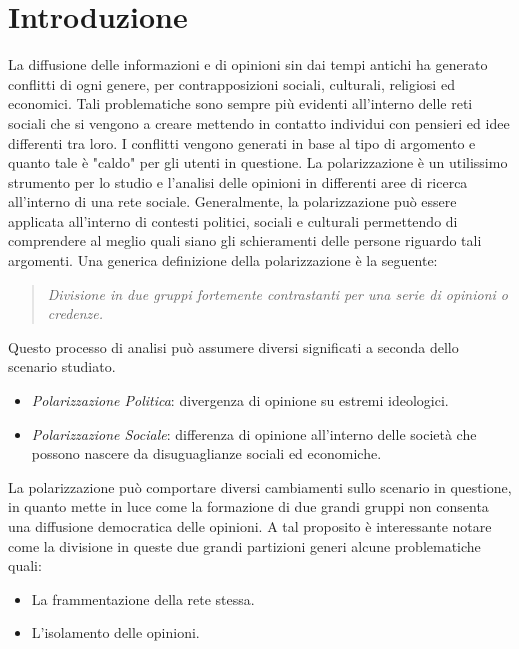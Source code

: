 \chapter{Introduzione}
\label{Introduzione}




La diffusione delle informazioni e di opinioni sin dai tempi antichi ha generato conflitti di ogni genere, per contrapposizioni sociali, culturali, religiosi ed economici. Tali problematiche sono sempre più evidenti all'interno delle reti sociali che si vengono a creare mettendo in contatto individui con pensieri ed idee differenti tra loro. I conflitti vengono generati in base al tipo di argomento e quanto tale è "caldo" per gli utenti in questione. 
La polarizzazione è un utilissimo strumento per lo studio e l'analisi delle opinioni in differenti aree di ricerca all'interno di una rete sociale. Generalmente, la polarizzazione può essere applicata all'interno di contesti politici, sociali e culturali permettendo di comprendere al meglio quali siano  gli schieramenti delle persone riguardo tali argomenti. Una generica definizione della polarizzazione è la seguente:
\begin{quote} 
\textit{Divisione in due gruppi fortemente contrastanti per una serie di opinioni o credenze.}
\end{quote}
Questo processo di analisi può assumere diversi significati a seconda dello scenario studiato. 
\begin{itemize}
\item \textit{Polarizzazione Politica}: divergenza di opinione su estremi ideologici.
\item \textit{Polarizzazione Sociale}: differenza di opinione all'interno delle società che possono nascere da disuguaglianze sociali ed economiche.

\end{itemize}

La polarizzazione può comportare diversi cambiamenti sullo scenario in questione, in quanto mette in luce come la formazione di due grandi gruppi non consenta una diffusione democratica delle opinioni. A tal proposito è interessante notare come la divisione in queste due grandi partizioni generi alcune problematiche quali:
\begin{itemize}
\item La frammentazione della rete stessa.
\item L'isolamento delle opinioni. 
\end{itemize} 

